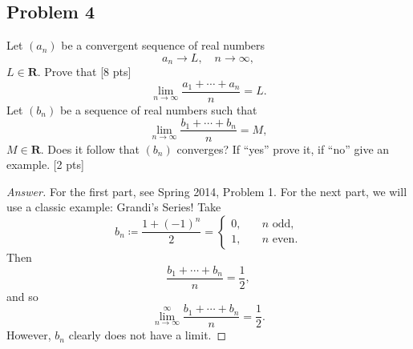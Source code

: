 \documentclass[12pt]{article}
\newcommand\paren[1]{\left( #1 \right)}
\theoremstyle{definition}
\begin{document}
\subsection{Problem 4}
Let $\paren{ a_n }$ be a convergent sequence of real numbers 
\[
    a_n \to L , \quad n \to \infty , 
\]
$L \in \mathbf{R}$. Prove that [8 pts]
\[
    \lim\limits_{n \to \infty} \frac{a_1 + \dotsb + a_n}{n} = L . 
\]
Let $\paren{ b_n }$ be a sequence of real numbers such that 
\[
    \lim\limits_{n \to \infty} \frac{b_1 + \dotsb + b_n}{n} = M , 
\]
$M \in \mathbf{R}$. Does it follow that $\paren{ b_n }$ converges? If ``yes'' prove it, if ``no'' give an example. [2 pts]
\begin{proof}[Answer]
    For the first part, see Spring 2014, Problem 1. For the next part, we will use a classic example: Grandi's Series! Take 
    \[
        b_n \coloneqq \frac{1 + (-1)^n}{2} = 
        \begin{cases}
            0 , & \quad \text{$n$ odd}, \\ 
            1 , & \quad \text{$n$ even} .
        \end{cases}
    \]
    Then 
    \[
        \frac{b_1 + \dotsb + b_n}{n} = \frac{1}{2} , 
    \]
    and so 
    \[
        \lim\limits_{n \to \infty}^{\infty} \frac{b_1 + \dotsb + b_n}{n} = \frac{1}{2}. 
    \]
    However, $b_n$ clearly does not have a limit. 
\end{proof}
\end{document}
